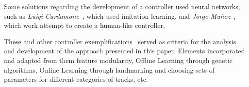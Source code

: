 	Some solutions regarding the development of a controller used neural networks, such as \emph{Luigi Cardamone}~\cite{exp}, which used imitation learning, and \emph{Jorge Mu\~{n}oz}~\cite{Munoz}, which work attempt to create a human-like controller.
	
	These and other controller exemplifications~\cite{SCRC} served as criteria for the analysis and development of the approach presented in this paper. Elements incorporated and adapted from them feature modularity, Offline Learning through genetic algorithms, Online Learning through landmarking and choosing sets of parameters for different categories of tracks, etc.
	
